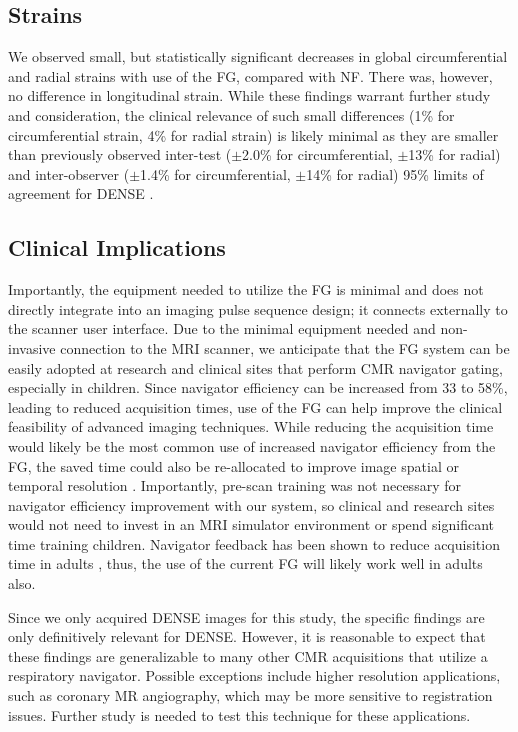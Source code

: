 	\subsection{Strains}
		We observed small, but statistically significant decreases in global circumferential and radial strains with use of the FG, compared with NF. There was, however, no difference in longitudinal strain. While these findings warrant further study and consideration, the clinical relevance of such small differences (1\% for circumferential strain, 4\% for radial strain) is likely minimal as they are smaller than previously observed inter-test ($\pm$2.0\% for circumferential, $\pm$13\% for radial) and inter-observer ($\pm$1.4\% for circumferential, $\pm$14\% for radial) 95\% limits of agreement for DENSE \cite{Wehner2015,Wehner2015a}.
	
	\subsection{Clinical Implications}
		Importantly, the equipment needed to utilize the FG is minimal and does not directly integrate into an imaging pulse sequence design; it connects externally to the scanner user interface. Due to the minimal equipment needed and non-invasive connection to the MRI scanner, we anticipate that the FG system can be easily adopted at research and clinical sites that perform CMR navigator gating, especially in children. Since navigator efficiency can be increased from 33 to 58\%, leading to reduced acquisition times, use of the FG can help improve the clinical feasibility of advanced imaging techniques. While reducing the acquisition time would likely be the most common use of increased navigator efficiency from the FG, the saved time could also be re-allocated to improve image spatial or temporal resolution \cite{Feuerlein2009}. Importantly, pre-scan training was not necessary for navigator efficiency improvement with our system, so clinical and research sites would not need to invest in an MRI simulator environment or spend significant time training children. Navigator feedback has been shown to reduce acquisition time in adults \cite{Feuerlein2009}, thus, the use of the current FG will likely work well in adults also.
		
		Since we only acquired DENSE images for this study,	the specific findings are only definitively relevant for DENSE. However, it is reasonable to expect that these findings are generalizable to many other CMR acquisitions that utilize a respiratory navigator. Possible exceptions include higher resolution applications, such as coronary MR angiography, which may be more sensitive to registration issues. Further study is needed to test this technique for these applications.
		
